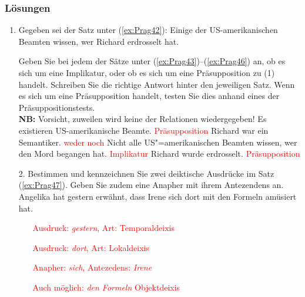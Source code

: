 {
\begin{frame}[shrink]
\frametitle{Lösungen}

\begin{enumerate}
\item Gegeben sei der Satz unter (\ref{ex:Prag42}):
\ea \label{ex:Prag42}
Einige der US-amerikanischen Beamten wissen, wer Richard erdrosselt hat.
\z
\item [] Geben Sie bei jedem der Sätze unter (\ref{ex:Prag43})--(\ref{ex:Prag46}) an, ob es sich um eine Implikatur, oder ob es sich um eine Präsupposition zu (1) handelt. Schreiben Sie die richtige Antwort hinter den jeweiligen Satz. Wenn es sich um eine Präsupposition handelt, testen Sie dies anhand eines der Präsuppositionstests. \\
\textbf{NB:} Vorsicht, zuweilen wird keine der Relationen wiedergegeben!
\ea\label{ex:Prag43} Es existieren US-amerikanische Beamte. \textcolor{red}{\ras Präsupposition}
\ex\label{ex:Prag44} Richard war ein Semantiker. \textcolor{red}{\ras weder noch}
\ex\label{ex:Prag45} Nicht alle US"=amerikanischen Beamten wissen, wer den Mord begangen hat. \textcolor{red}{\ras Implikatur}
\ex\label{ex:Prag46} Richard wurde erdrosselt. \textcolor{red}{\ras Präsupposition}
\z	
\end{enumerate}

\end{frame}


\begin{frame}
\begin{enumerate}
\item[2.] Bestimmen und kennzeichnen Sie zwei deiktische Ausdrücke im Satz (\ref{ex:Prag47}). Geben Sie zudem eine Anapher mit ihrem Antezendens an.
\ea\label{ex:Prag47} Angelika hat gestern erwähnt, dass Irene sich dort mit den Formeln amüsiert hat.
\z 


\begin{itemize}
\item[] \textcolor{red}{Ausdruck: \emph{gestern}, Art: Temporaldeixis}
\item[] \textcolor{red}{Ausdruck: \emph{dort}, Art: Lokaldeixis}
\item[] \textcolor{red}{Anapher: \emph{sich}, Antezedens: \emph{Irene}}
\item[] \textcolor{red}{Auch möglich: \emph{den Formeln} \ras Objektdeixis}
\end{itemize}


\end{enumerate}
\end{frame}}
